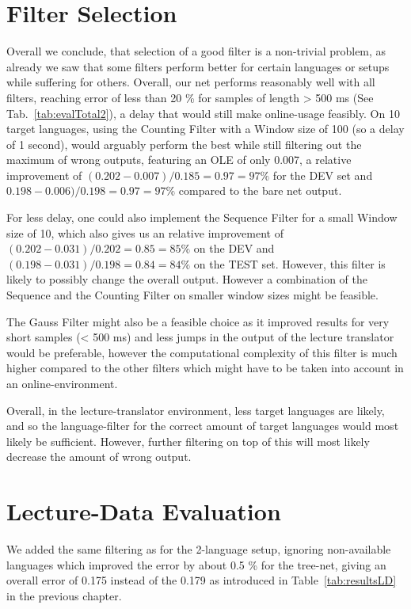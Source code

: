 \section{Filter Selection}
\label{sec:eval:filterSelection}

Overall we conclude, that selection of a good filter is  a non-trivial problem, as already we saw that some filters perform better for certain languages or setups while suffering for others. Overall, our net performs reasonably well with all filters, reaching error of less than 20 \% for samples of length > 500 ms (See Tab.~\ref{tab:evalTotal2}), a delay that would still make online-usage feasibly. On 10 target languages, using the Counting Filter with a Window size of 100 (so a delay of 1 second), would arguably perform the best while still filtering out the maximum of wrong outputs, featuring an OLE of only 0.007, a relative improvement of \((0.202-0.007) / 0.185 = 0.97 = 97 \% \) for the DEV set and \( 0.198- 0.006)/ 0.198 = 0.97 = 97\% \) compared to the bare net output.

For less delay, one could also implement the Sequence Filter for a small Window size of 10, which also gives us an relative improvement of \((0.202-0.031) / 0.202 = 0.85 = 85 \%\) on the DEV and \((0.198 - 0.031) / 0.198 = 0.84 = 84\% \) on the TEST set. However, this filter is likely to possibly change the overall output. However a combination of the Sequence and the Counting Filter on smaller window sizes might be feasible.

The Gauss Filter might also be a feasible choice as it improved results for very short samples (< 500 ms) and less jumps in the output of the lecture translator would be preferable, however the computational complexity of this filter is much higher compared to the other filters which might have to be taken into account in an online-environment.

Overall, in the lecture-translator environment, less target languages are likely, and so the language-filter for the correct amount of target languages would most likely be sufficient. However, further filtering on top of this will most likely decrease the amount of wrong output.

\section{Lecture-Data Evaluation}
\label{sec:eval:LD}

We added the same filtering as for the 2-language setup, ignoring non-available languages which improved the error by about 0.5 \% for the tree-net, giving an overall error of 0.175 instead of the 0.179 as introduced in Table~\ref{tab:resultsLD} in the previous chapter.





	